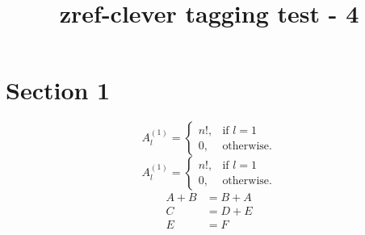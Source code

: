 \documentclass{article}
\title{zref-clever tagging test - 4}
\begin{document}
\section{Section 1}
\begin{equation}\label{eq:1}
A^{(1)}_l =\begin{cases} n!,&\text{if }l =1\\
0,&\text{otherwise}.\end{cases}
\end{equation}
\begin{equation*} \tag{foo}\label{eq:2}
A^{(1)}_l =\begin{cases} n!,&\text{if }l =1\\
0,&\text{otherwise}.\end{cases}
\end{equation*}
\begin{subequations}\label{eq:3}
\begin{align}
A+B&=B+A\\
C&=D+E\label{eq:3b}\\
E&=F
\end{align}
\end{subequations}
\end{document}
